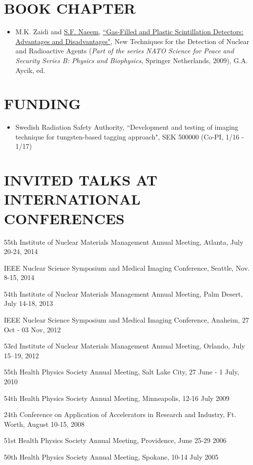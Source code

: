 \documentclass[paper=letter,fontsize=11pt]{scrartcl} %
\newcommand{\NewPart}[2]{\section*{\uppercase{#1} #2}}
\newcommand{\ArxivEntry}[3]{
		\noindent #1, ``\href{http://arxiv.org/abs/#3}{#2}", \textit{{cond-mat/}#3}.}
\newcommand{\TalkEntry}[4]{
		\noindent #1, #2, #3 #4}
\begin{document}

\NewPart{Book Chapter}{}
\begin{itemize}
\item M.K. Zaidi and \underline{S.F. Naeem}, \href{http://dx.doi.org/10.1007/978-1-4020-9600-6_16}{``Gas-Filled and Plastic Scintillation Detectors: Advantages and Disadvantages"}, New Techniques for the Detection of Nuclear and Radioactive Agents (\textit{Part of the series NATO Science for Peace and Security Series B: Physics and Biophysics}, Springer Netherlands, 2009), G.A. Aycik, ed.
\end{itemize}


\NewPart{Funding}{}

\begin{itemize}

\item {Swedish Radiation Safety Authority, ``Development and testing of imaging technique for tungsten-based tagging approach", SEK 500000 (Co-PI, 1/16 - 1/17)}

\end{itemize}

\NewPart{Invited Talks at International Conferences}{}
\begin{etaremune}
\item\TalkEntry{55th Institute of Nuclear Materials Management Annual Meeting}{Atlanta}{July 20-24, 2014}{}
\item\TalkEntry{IEEE Nuclear Science Symposium and Medical Imaging Conference}{Seattle}{Nov. 8-15, 2014}{}
\item\TalkEntry{54th Institute of Nuclear Materials Management Annual Meeting}{Palm Desert}{July 14-18, 2013}{}
\item\TalkEntry{IEEE Nuclear Science Symposium and Medical Imaging Conference}{Anaheim}{27 Oct - 03 Nov, 2012}{}
\item\TalkEntry{53rd Institute of Nuclear Materials Management Annual Meeting}{Orlando}{July 15–19, 2012}{}
\item\TalkEntry{55th Health Physics Society Annual Meeting}{Salt Lake City}{27 June - 1 July, 2010}
\item\TalkEntry{54th Health Physics Society Annual Meeting}{Minneapolis}{12-16 July 2009}
\item\TalkEntry{24th Conference on Application of Accelerators in Research and Industry}{Ft. Worth}{August 10-15, 2008}{}
\item\TalkEntry{51st Health Physics Society Annual Meeting}{Providence}{June 25-29 2006}
\item\TalkEntry{50th Health Physics Society Annual Meeting}{Spokane}{10-14 July 2005}
\end{etaremune}
\end{document}
